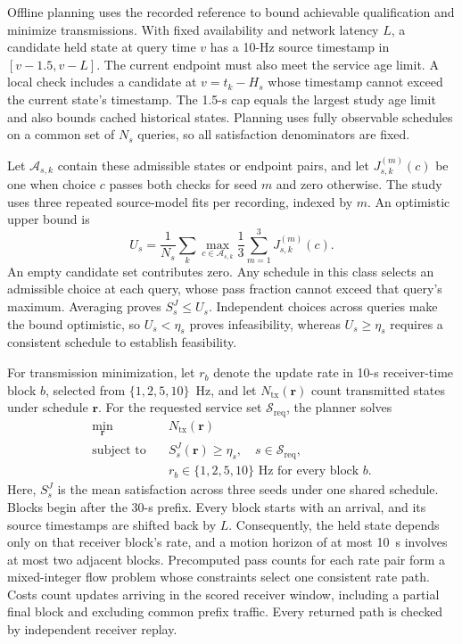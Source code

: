 \documentclass[journal]{IEEEtran}
\newcommand{\rev}[1]{#1}
\newcommand{\newrev}[1]{{#1}}
\begin{document}
\rev{Offline planning uses the recorded reference to bound achievable
qualification and minimize transmissions. With fixed availability and
network latency $L$, a candidate held state at query time $v$ has a
10-Hz source timestamp in $[v-1.5,v-L]$. The current endpoint must also
meet the service age limit. A local check includes a candidate at
$v=t_k-H_s$ whose timestamp cannot exceed the current state's timestamp.
The 1.5-s cap equals the largest study age limit and also bounds cached
historical states. Planning uses fully observable schedules on a common
set of $N_s$ queries, so all satisfaction denominators are fixed.}

\rev{Let $\mathcal{A}_{s,k}$ contain these admissible states or endpoint
pairs, and let $J_{s,k}^{(m)}(c)$ be one when choice $c$ passes both
checks for seed $m$ and zero otherwise. \newrev{The study uses three
repeated source-model fits per recording, indexed by $m$.} An optimistic upper bound is
\begin{equation}
U_s=\frac{1}{N_s}\sum_k
\max_{c\in\mathcal{A}_{s,k}}\frac{1}{3}\sum_{m=1}^{3}J_{s,k}^{(m)}(c).
\label{eq:optimistic_qualification_bound}
\end{equation}
An empty candidate set contributes zero. Any schedule in this class
selects an admissible choice at each query, whose pass fraction cannot
exceed that query's maximum. Averaging proves $S_s^J\leq U_s$.
Independent choices across queries make the bound optimistic, so
$U_s<\eta_s$ proves infeasibility, whereas $U_s\geq\eta_s$ requires a
consistent schedule to establish feasibility.}

\rev{For transmission minimization, let $r_b$ denote the update rate in
10-s receiver-time block $b$, selected from $\{1,2,5,10\}$~Hz, and let
\newrev{$N_{\mathrm{tx}}(\mathbf{r})$ count transmitted states under
schedule $\mathbf{r}$.} For the requested service set $\mathcal{S}_{\mathrm{req}}$, the planner
solves
\begin{equation}
\begin{aligned}
\min_{\mathbf{r}}\quad & N_{\mathrm{tx}}(\mathbf{r})\\
\text{subject to}\quad & S_s^J(\mathbf{r})\geq\eta_s,
\quad s\in\mathcal{S}_{\mathrm{req}},\\
& r_b\in\{1,2,5,10\}\text{~Hz for every block }b.
\end{aligned}
\label{eq:offline_delivery_optimization}
\end{equation}
Here, $S_s^J$ is the mean satisfaction across three seeds under one
shared schedule. Blocks begin after the 30-s prefix. Every block starts
with an arrival, and its source timestamps are shifted back by $L$.
Consequently, the held state depends only on that receiver block's rate,
and a motion horizon of at most 10~s involves at most two adjacent blocks.
Precomputed pass counts for each rate pair form a mixed-integer flow
problem whose constraints select one consistent rate path. Costs count
updates arriving in the scored receiver window, including a partial
final block and excluding common prefix traffic. Every returned path is
checked by independent receiver replay.}
\end{document}
